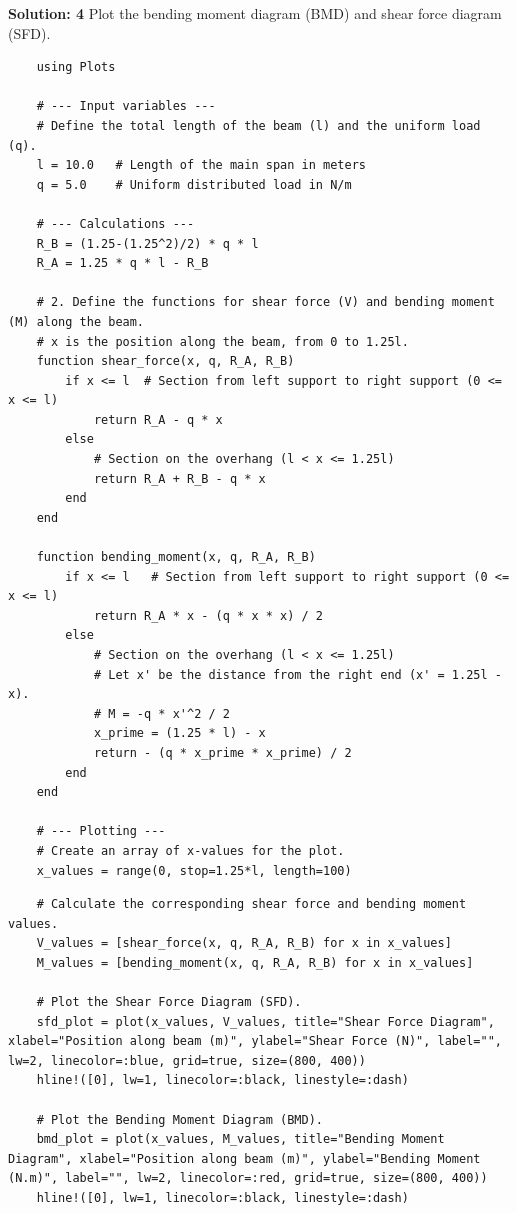 \documentclass{homework}
\begin{document}
\begin{solution}
    \textbf{Solution: 4}
    Plot the bending moment diagram (BMD) and shear force diagram (SFD). 
    \sloppy
    \begin{verbatim}
    using Plots 

    # --- Input variables ---
    # Define the total length of the beam (l) and the uniform load (q).
    l = 10.0   # Length of the main span in meters
    q = 5.0    # Uniform distributed load in N/m
    
    # --- Calculations ---
    R_B = (1.25-(1.25^2)/2) * q * l
    R_A = 1.25 * q * l - R_B
    
    # 2. Define the functions for shear force (V) and bending moment (M) along the beam.
    # x is the position along the beam, from 0 to 1.25l.
    function shear_force(x, q, R_A, R_B)
        if x <= l  # Section from left support to right support (0 <= x <= l)
            return R_A - q * x
        else
            # Section on the overhang (l < x <= 1.25l)
            return R_A + R_B - q * x
        end
    end
    
    function bending_moment(x, q, R_A, R_B)
        if x <= l   # Section from left support to right support (0 <= x <= l)
            return R_A * x - (q * x * x) / 2
        else
            # Section on the overhang (l < x <= 1.25l)
            # Let x' be the distance from the right end (x' = 1.25l - x).
            # M = -q * x'^2 / 2
            x_prime = (1.25 * l) - x
            return - (q * x_prime * x_prime) / 2
        end
    end  

    # --- Plotting ---
    # Create an array of x-values for the plot.
    x_values = range(0, stop=1.25*l, length=100)
    \end{verbatim}
    \begin{verbatim}
    # Calculate the corresponding shear force and bending moment values.
    V_values = [shear_force(x, q, R_A, R_B) for x in x_values]
    M_values = [bending_moment(x, q, R_A, R_B) for x in x_values]
    
    # Plot the Shear Force Diagram (SFD).
    sfd_plot = plot(x_values, V_values, title="Shear Force Diagram", xlabel="Position along beam (m)", ylabel="Shear Force (N)", label="", lw=2, linecolor=:blue, grid=true, size=(800, 400))
    hline!([0], lw=1, linecolor=:black, linestyle=:dash)
    
    # Plot the Bending Moment Diagram (BMD).
    bmd_plot = plot(x_values, M_values, title="Bending Moment Diagram", xlabel="Position along beam (m)", ylabel="Bending Moment (N.m)", label="", lw=2, linecolor=:red, grid=true, size=(800, 400))
    hline!([0], lw=1, linecolor=:black, linestyle=:dash)
    

\end{verbatim}
\end{solution}
\end{document}
